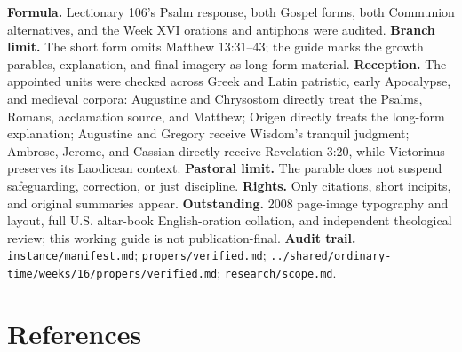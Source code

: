 \begin{deepstudy}
\begin{studyframe}
\textbf{Formula.} Lectionary 106's Psalm response, both Gospel forms, both Communion alternatives, and the Week XVI orations and antiphons were audited. \textbf{Branch limit.} The short form omits Matthew 13:31--43; the guide marks the growth parables, explanation, and final imagery as long-form material. \textbf{Reception.} The appointed units were checked across Greek and Latin patristic, early Apocalypse, and medieval corpora: Augustine and Chrysostom directly treat the Psalms, Romans, acclamation source, and Matthew; Origen directly treats the long-form explanation; Augustine and Gregory receive Wisdom's tranquil judgment; Ambrose, Jerome, and Cassian directly receive Revelation 3:20, while Victorinus preserves its Laodicean context. \textbf{Pastoral limit.} The parable does not suspend safeguarding, correction, or just discipline. \textbf{Rights.} Only citations, short incipits, and original summaries appear. \textbf{Outstanding.} 2008 page-image typography and layout, full U.S. altar-book English-oration collation, and independent theological review; this working guide is not publication-final. \textbf{Audit trail.} \nolinkurl{instance/manifest.md}; \nolinkurl{propers/verified.md}; \nolinkurl{../shared/ordinary-time/weeks/16/propers/verified.md}; \nolinkurl{research/scope.md}.
\end{studyframe}

\section*{References}


\end{deepstudy}
